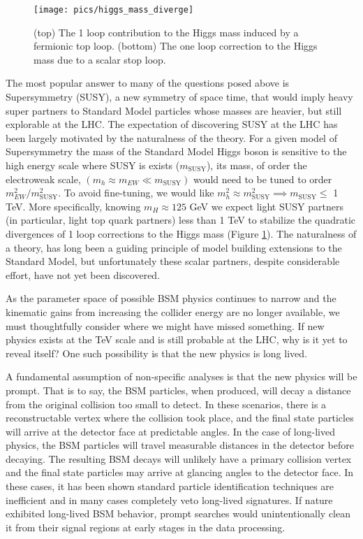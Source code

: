 \begin{figure}
\begin{center}
\texttt{[image: pics/higgs\_mass\_diverge]}
\end{center}
\caption{(top) The 1 loop contribution to the Higgs mass induced by a fermionic top loop. (bottom) The one loop
correction to the Higgs mass due to a scalar stop loop.}
\label{fig:higgs_mass_diverge}
\end{figure}

The most popular answer to many of the questions posed above is Supersymmetry (SUSY), 
a new symmetry of space time, that would imply heavy super partners to Standard Model particles
whose masses are heavier, but still explorable at the LHC.
The expectation of discovering SUSY at the LHC has been largely motivated
by the naturalness of the theory. For a given model of Supersymmetry the mass of
the Standard Model Higgs boson is sensitive to the high energy scale where SUSY
is exists ($m_{\textrm{SUSY}}$), its mass, of order the electroweak 
scale, $(m_h \approx m_{EW} \ll m_{\textrm{SUSY}})$
would need to be tuned to order $m_{EW}^2/m_{\textrm{SUSY}}^2$. To avoid fine-tuning, 
we would like  $m_h^2 \approx m_{\textrm{SUSY}}^2 \implies m_{\textrm{SUSY}} \leq$ 1 TeV.  
More specifically, knowing $m_H \approx 125$ GeV we expect light SUSY partners (in particular, light top quark partners)
less than 1 TeV to stabilize the quadratic divergences of 1 loop corrections to the Higgs mass 
(Figure \ref{fig:higgs_mass_diverge}). The naturalness of a theory, has 
long been a guiding principle of model building extensions to the Standard Model, 
but unfortunately these scalar partners, despite considerable effort, have not 
yet been discovered.

As the parameter space of possible BSM physics continues to narrow and the kinematic gains from increasing the
collider energy are no longer available, we must thoughtfully consider where we might have missed something. 
If new physics exists at the TeV scale and is still probable at the LHC, why is it yet to reveal itself? One such
possibility is that the new physics is long lived.

A fundamental assumption of non-specific analyses is that the new physics will be prompt. That is to say,
the BSM particles, when produced, will decay a distance from the original collision too small to detect. 
In these scenarios, there is a reconstructable vertex where the collision took
 place, and the final state particles will arrive
at the detector face at predictable angles. In the case of long-lived physics, the BSM particles will travel 
measurable distances in the detector before decaying. The resulting BSM decays will unlikely have a 
primary collision vertex and the final state particles may arrive at glancing angles to the detector face. 
In these cases, it has been shown standard particle identification techniques  are   
inefficient and in many cases completely veto long-lived signatures. 
If nature exhibited long-lived BSM behavior, prompt searches would unintentionally clean it from
their signal regions at early stages in the data processing. 

